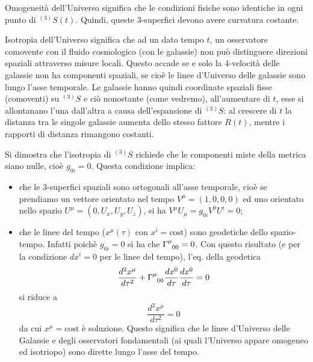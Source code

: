Omogeneità dell'Universo significa che le condizioni fisiche sono identiche in
ogni punto di $^{(3)}S(t)$.  Quindi, queste 3-superfici devono avere curvatura
costante.

Isotropia dell'Universo significa che ad un dato tempo $t$, un osservatore
comovente con il fluido cosmologico (con le galassie) non può distinguere
direzioni spaziali attraverso misure locali.  Questo accade se e solo la
4-velocità delle galassie non ha componenti spaziali, se cioè le linee
d'Universo delle galassie sono lungo l'asse temporale.  Le galassie hanno quindi
coordinate spaziali fisse (comoventi) su $^{(3)}S$ e ciò nonostante (come
vedremo), all'aumentare di $t$, esse si allontanano l'una dall'altra a causa
dell'espansione di $^{(3)}S$: al crescere di $t$ la distanza tra le singole
galassie aumenta dello stesso fattore $R(t)$, mentre i rapporti di distanza
rimangono costanti.

Si dimostra che l'isotropia di $^{(3)}S$ richiede che le componenti miste della
metrica siano nulle, cioè $g_{0i}=0$. Questa condizione implica:
\begin{itemize}
\item che le 3-superfici spaziali sono ortogonali all'asse temporale, cioè se
  prendiamo un vettore orientato nel tempo $V^{\mu}=(1,0,0,0)$ ed uno orientato
  nello spazio
  $U^{\mu}=(0,U_x,U_y,U_z)$, si ha $V^{\mu} U_{\mu} = g_{0i} V^0 U^i =0$;
\item che le linee del tempo ($x^{\mu}(\tau)$ con $x^i=\text{cost}$) sono
  geodetiche dello spazio-tempo. Infatti poichè $g_{0i}=0$ si ha che
  $\tensor{\Gamma}{^{\mu}_{00}}=0$. Con questo risultato (e per la condizione
  $dx^i=0$ per le linee del tempo), l'eq. della geodetica
  \begin{equation}
    \frac{d^2 x^{\mu}} {d\tau^2} + \tensor{\Gamma}{^{\mu}_{00}} \frac{dx^0}{d
      \tau} \frac{dx^0}{d \tau} =0
  \end{equation}
  si riduce a
  \begin{equation}
    \frac{d^2 x^{\mu}} {d\tau^2} =0
  \end{equation}
  da cui $x^{\mu}=\text{cost}$ è soluzione.  Questo significa che le linee
  d'Universo delle Galassie e degli osservatori fondamentali (ai quali
  l'Universo appare omogeneo ed isotriopo) sono dirette lungo l'asse del tempo.
\end{itemize}

